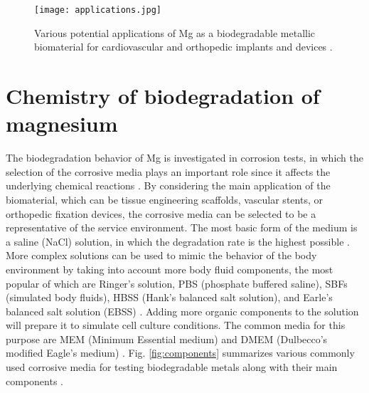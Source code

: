 \begin{figure}
\centering
\medskip
\texttt{[image: applications.jpg]}
\caption[Various potential applications of Mg as a biodegradable biomaterial]{Various potential applications of Mg as a biodegradable metallic biomaterial for cardiovascular and orthopedic implants and devices \cite{Han2019}.}
\label{fig:intro_applications}
\end{figure}


\section{Chemistry of biodegradation of magnesium}


The biodegradation behavior of Mg is investigated in corrosion tests, in which the selection of the corrosive media plays an important role since it affects the underlying chemical reactions \cite{Mei2020}. By considering the main application of the biomaterial, which can be tissue engineering scaffolds, vascular stents, or orthopedic fixation devices, the corrosive media can be selected to be a representative of the service environment. The most basic form of the medium is a saline (NaCl) solution, in which the degradation rate is the highest possible \cite{Mei2020}. More complex solutions can be used to mimic the behavior of the body environment by taking into account more body fluid components, the most popular of which are Ringer's solution, \gls{PBS} (phosphate buffered saline), \gls{SBF}s (simulated body fluids), \gls{HBSS} (Hank's balanced salt solution), and Earle's balanced salt solution (\gls{EBSS}) \cite{Mei2020}. Adding more organic components to the solution will prepare it to simulate cell culture conditions. The common media for this purpose are \gls{MEM} (Minimum Essential medium) and \gls{DMEM} (Dulbecco's modified Eagle's medium) \cite{Mei2020}. Fig. \ref{fig:components} summarizes various commonly used corrosive media for testing biodegradable metals along with their main components  \cite{Mei2020}.


